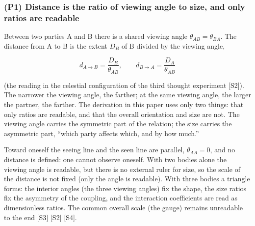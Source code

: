 \documentclass[
  a4paper,
]{article}
\begin{document}
\subsubsection{(P1) Distance is the ratio of viewing angle to size, and
only ratios are
readable}\label{p1-distance-is-the-ratio-of-viewing-angle-to-size-and-only-ratios-are-readable}

Between two parties A and B there is a shared viewing angle
\(\theta_{AB}=\theta_{BA}\). The distance from A to B is the extent
\(D_B\) of B divided by the viewing angle,

\[
d_{A\to B}=\frac{D_B}{\theta_{AB}},\qquad d_{B\to A}=\frac{D_A}{\theta_{AB}}
\]

(the reading in the celestial configuration of the third thought
experiment {[}S2{]}). The narrower the viewing angle, the farther; at
the same viewing angle, the larger the partner, the farther. The
derivation in this paper uses only two things: that only ratios are
readable, and that the overall orientation and size are not. The viewing
angle carries the symmetric part of the relation; the size carries the
asymmetric part, ``which party affects which, and by how much.''

Toward oneself the seeing line and the seen line are parallel,
\(\theta_{AA}=0\), and no distance is defined: one cannot observe
oneself. With two bodies alone the viewing angle is readable, but there
is no external ruler for size, so the scale of the distance is not fixed
(only the angle is readable). With three bodies a triangle forms: the
interior angles (the three viewing angles) fix the shape, the size
ratios fix the asymmetry of the coupling, and the interaction
coefficients are read as dimensionless ratios. The common overall scale
(the gauge) remains unreadable to the end {[}S3{]} {[}S2{]} {[}S4{]}.
\end{document}
